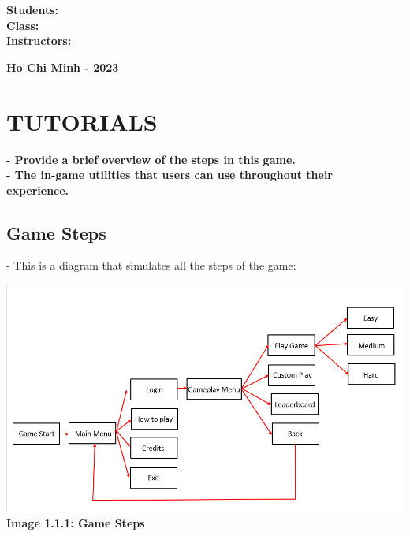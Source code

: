 \documentclass[12pt,a4paper]{report}
\begin{document}
\begin{flushleft}
\hspace{1.5cm} \textbf{\large Students\hspace{0.7cm}:}
\\[0.4cm]
\hspace{1.5cm} \textbf{\large Class\hspace{1.5cm}:}
\hspace{0.2cm}{\large 22CLC10}\\[0.4cm]
\hspace{1.5cm} \textbf{\large Instructors\hspace{0.2cm}:}
\\
\end{flushleft}

\vspace{1.0cm}
\begin{center}
\textbf{{\large Ho Chi Minh - 2023}}\\
\end{center}

\tableofcontents
\pagestyle{fancy}

\chapter{TUTORIALS}
{\textbf{\large - Provide a brief overview of the steps in this game.\\[0.2cm]
- The in-game utilities that users can use throughout their experience.}}\
\section{Game Steps}
- This is a diagram that simulates all the steps of the game:\\[0.2cm]
\begin{center}
    \includegraphics[scale=0.5]{Game Steps.png}\\[0.2cm]
    \textbf{Image 1.1.1: Game Steps}
\end{center}
\end{document}
